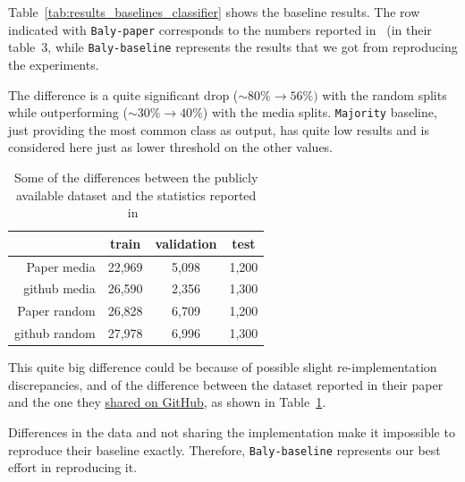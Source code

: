 Table~\ref{tab:results_baselines_classifier} shows the baseline results.
The row indicated with \texttt{Baly-paper} corresponds to the numbers reported in~\citet{baly2020we} (in their table~3, while \texttt{Baly-baseline} represents the results that we got from reproducing the experiments.

The difference is a quite significant drop ($\sim80\% \rightarrow 56\%)$ with the random splits while outperforming ($\sim30\% \rightarrow 40\%$) with the media splits.
\texttt{Majority} baseline, just providing the most common class as output, has quite low results and is considered here just as lower threshold on the other values.

\begin{table}[!htbp]
   \centering
   \begin{tabular}{r|c|c|c}
       & train & validation & test \\
       \hline
       Paper media & 22,969 & 5,098 & 1,200 \\
       github media & 26,590 & 2,356 & 1,300 \\
       \hline
       Paper random & 26,828 & 6,709 & 1,200 \\
       github random & 27,978 & 6,996 & 1,300
   \end{tabular}
   \caption{Some of the differences between the publicly available dataset and the statistics reported in~\citet{baly2020we}}
   \label{tab:baly_size}
\end{table}


This quite big difference could be because of possible slight re-implementation discrepancies, and of the difference between the dataset reported in their paper and the one they \href{https://github.com/ramybaly/Article-Bias-Prediction/issues/4}{shared on GitHub}, as shown in Table~\ref{tab:baly_size}.%

Differences in the data and not sharing the implementation make it impossible to reproduce their baseline exactly.
Therefore, \texttt{Baly-baseline} represents our best effort in reproducing it.

